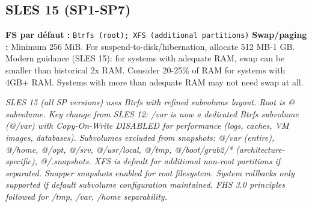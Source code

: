 \documentclass[10pt,a4paper]{article}
\begin{document}
\subsection{SLES 15 (SP1-SP7)}
\noindent\small \textbf{FS par d\'efaut :} \texttt{Btrfs (root); XFS (additional partitions)} \quad\textbullet\quad \textbf{Swap/paging :} Minimum 256 MiB. For suspend-to-disk/hibernation, allocate 512 MB-1 GB. Modern guidance (SLES 15): for systems with adequate RAM, swap can be smaller than historical 2x RAM. Consider 20-25\% of RAM for systems with 4GB+ RAM. Systems with more than adequate RAM may not need swap at all.\normalsize\par\smallskip
\noindent\small\textit{SLES 15 (all SP versions) uses Btrfs with refined subvolume layout. Root is @ subvolume. Key change from SLES 12: /var is now a dedicated Btrfs subvolume (@/var) with Copy-On-Write DISABLED for performance (logs, caches, VM images, databases). Subvolumes excluded from snapshots: @/var (entire), @/home, @/opt, @/srv, @/usr/local, @/tmp, @/boot/grub2/* (architecture-specific), @/.snapshots. XFS is default for additional non-root partitions if separated. Snapper snapshots enabled for root filesystem. System rollbacks only supported if default subvolume configuration maintained. FHS 3.0 principles followed for /tmp, /var, /home separability.}\normalsize\par\smallskip
\end{document}
